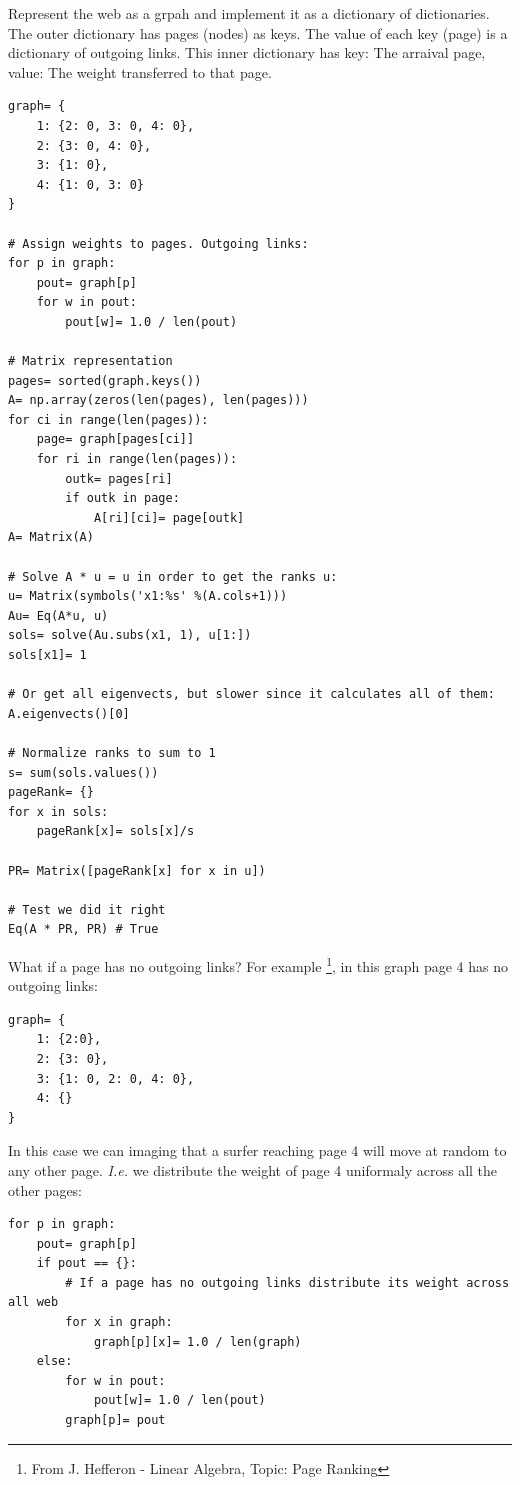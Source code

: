 Represent the web as a grpah and implement it as a dictionary of dictionaries. The outer dictionary has pages
(nodes) as keys. The value of each key (page) is a dictionary of outgoing links.
This inner dictionary has key: The arraival page, value: The weight transferred to
that page.

\begin{verbatim}
graph= {
    1: {2: 0, 3: 0, 4: 0},
    2: {3: 0, 4: 0},
    3: {1: 0},
    4: {1: 0, 3: 0}
}

# Assign weights to pages. Outgoing links:
for p in graph:
    pout= graph[p]
    for w in pout:
        pout[w]= 1.0 / len(pout)

# Matrix representation
pages= sorted(graph.keys())
A= np.array(zeros(len(pages), len(pages)))
for ci in range(len(pages)):
    page= graph[pages[ci]]
    for ri in range(len(pages)):
        outk= pages[ri]
        if outk in page:
            A[ri][ci]= page[outk]
A= Matrix(A)

# Solve A * u = u in order to get the ranks u:
u= Matrix(symbols('x1:%s' %(A.cols+1)))
Au= Eq(A*u, u)
sols= solve(Au.subs(x1, 1), u[1:])
sols[x1]= 1

# Or get all eigenvects, but slower since it calculates all of them:
A.eigenvects()[0]

# Normalize ranks to sum to 1
s= sum(sols.values())
pageRank= {}
for x in sols:
    pageRank[x]= sols[x]/s

PR= Matrix([pageRank[x] for x in u])

# Test we did it right
Eq(A * PR, PR) # True

\end{verbatim}

What if a page has no outgoing links? For example
\footnote{From J. Hefferon - Linear Algebra, Topic: Page Ranking}, in this graph
page 4 has no outgoing links:

\begin{verbatim}
graph= {
    1: {2:0},
    2: {3: 0},
    3: {1: 0, 2: 0, 4: 0},
    4: {}
}
\end{verbatim}

In this case we can imaging that a surfer reaching page 4 will move at random to
any other page. \emph{I.e.} we distribute the weight of page 4 uniformaly across
all the other pages:

\begin{verbatim}
for p in graph:
    pout= graph[p]
    if pout == {}:
        # If a page has no outgoing links distribute its weight across all web 
        for x in graph:
            graph[p][x]= 1.0 / len(graph)
    else:
        for w in pout:
            pout[w]= 1.0 / len(pout)
        graph[p]= pout
\end{verbatim}

